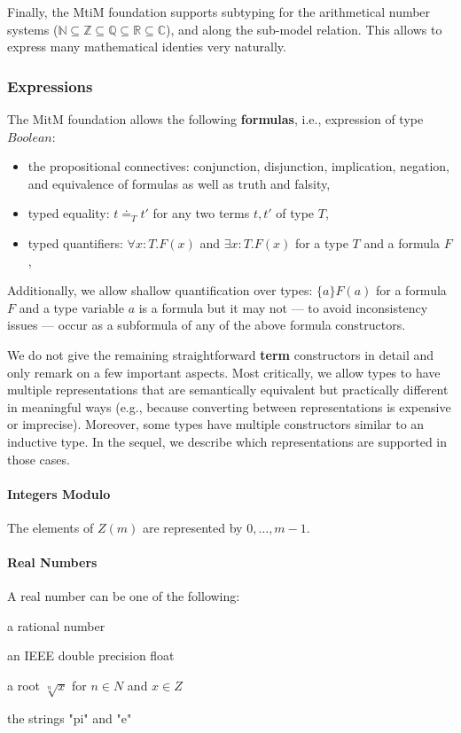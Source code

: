 Finally, the MtiM foundation supports subtyping for the arithmetical number systems ($\mathbb{N}\subseteq\mathbb{Z}\subseteq\mathbb{Q}\subseteq\mathbb{R}\subseteq\mathbb{C}$), and along the sub-model relation.
This allows to express many mathematical identies very naturally.

\subsubsection{Expressions}

The MitM foundation allows the following \textbf{formulas}, i.e., expression of type $Boolean$:
\begin{itemize}
\item the propositional connectives: conjunction, disjunction, implication, negation, and equivalence of formulas as well as truth and falsity,
\item typed equality: $t\doteq_T t'$ for any two terms $t,t'$ of type $T$,
\item typed quantifiers: $\forall x:T.F(x)$ and $\exists x:T.F(x)$ for a type $T$ and a formula $F$,
\end{itemize}
Additionally, we allow shallow quantification over types: $\{a\}F(a)$ for a formula $F$ and a type variable $a$ is a formula but it may not --- to avoid inconsistency issues --- occur as a subformula of any of the above formula constructors.

We do not give the remaining straightforward \textbf{term} constructors in detail and only remark on a few important aspects.
Most critically, we allow types to have multiple representations that are semantically
equivalent but practically different in meaningful ways (e.g., because converting between
representations is expensive or imprecise). Moreover, some types have multiple constructors similar to an inductive type. In the sequel, we describe which representations are supported in those cases.

\paragraph{Integers Modulo}
The elements of $Z(m)$ are represented by $0,\ldots,m-1$.

\paragraph{Real Numbers}
A real number can be one of the following:
\begin{compactitem}
 \item a rational number
 \item an IEEE double precision float
 \item a root $\sqrt[n]{x}$ for $n\in N$ and $x\in Z$
 \item the strings "pi" and "e"
\end{compactitem}

